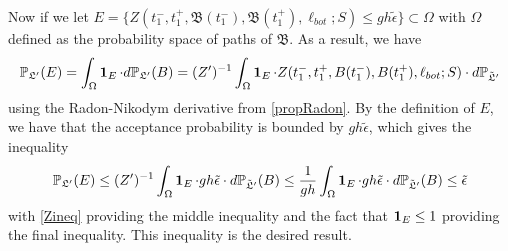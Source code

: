 	Now if we let $E=\{Z(t_1^-,t_1^+,\mathfrak{B}(t_1^-),\mathfrak{B}(t_1^+),\ell_{bot};S)\leq gh\tilde\epsilon\}\subset \Omega$ with $\Omega$ defined as the probability space of paths of $\mathfrak B$. As a result, we have 
	\[
	\mathbb{P}_{\mathfrak L'}(E)=\int_\Omega \operatorname{\mathbf{1}}_E\cdot d\mathbb{P}_{\mathfrak L'}(B)=(Z')^{-1}\int_\Omega\operatorname{\mathbf{1}}_E\cdot Z(t_1^-,t_1^+,B(t_1^-),B(t_1^+),\ell_{bot};S)\cdot d\mathbb{P}_{\tilde{\mathfrak{L}}'}
	\]
	using the Radon-Nikodym derivative from \ref{propRadon}. By the definition of $E$, we have that the acceptance probability is bounded by $gh\tilde{\epsilon}$, which gives the inequality \[\mathbb{P}_{\mathfrak L'}(E)\leq (Z')^{-1}\int_\Omega \operatorname{\mathbf{1}}_E\cdot gh\tilde{\epsilon}\cdot d\mathbb{P}_{\tilde{\mathfrak{L}}'}(B)\leq \frac{1}{gh}\int_\Omega\operatorname{\mathbf{1}}_E\cdot gh\tilde\epsilon\cdot d\mathbb{P}_{\tilde{\mathfrak{L}}'}(B)\leq \tilde{\epsilon}\] with \ref{Zineq}  providing the middle inequality and the fact that $\operatorname{\mathbf{1}}_E\leq 1$ providing the final inequality. This inequality is the desired result.













